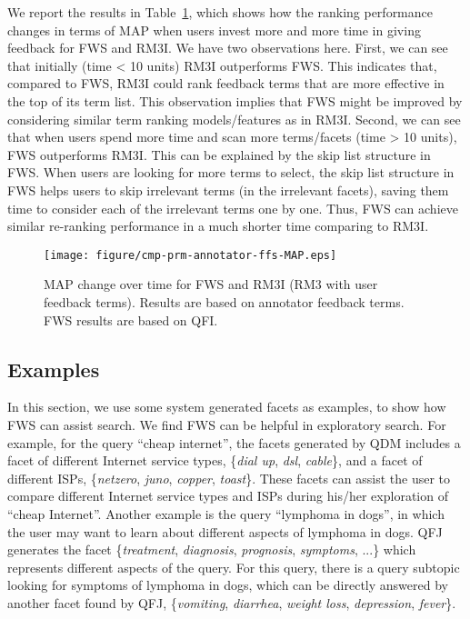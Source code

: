 We report the results in Table~\ref{fig:ex-rm3i}, which shows how the ranking performance changes in terms of MAP when users invest more and more time in giving feedback for FWS and RM3I. We have two observations here. First, we can see that initially (time < 10 units) RM3I outperforms FWS. This indicates that, compared to FWS, RM3I could rank feedback terms that are more effective in the top of its term list. This observation implies that FWS might be improved by considering similar term ranking models/features as in RM3I. Second, we can see that when users spend more time and scan more terms/facets (time > 10 units), FWS outperforms RM3I. This can be explained by the skip list structure in FWS. When users are looking for more terms to select, the skip list structure in FWS helps users to skip irrelevant terms (in the irrelevant facets), saving them time to consider each of the irrelevant terms one by one. Thus, FWS can achieve similar re-ranking performance in a much shorter time comparing to RM3I.
 
\begin{figure}[!ht]
\centering
\texttt{[image: figure/cmp-prm-annotator-ffs-MAP.eps]}
\caption{MAP change over time for FWS and RM3I (RM3 with user feedback terms). Results are based on annotator feedback terms. FWS results are based on QFI.}
\label{fig:ex-rm3i}
\end{figure}

\subsection{Examples}
In this section, we use some system generated facets as examples, to show how FWS can assist search. We find FWS can be helpful in exploratory search. 
For example, for the query ``cheap internet'', the facets generated by QDM includes a facet of different Internet service types, \{\textit{dial up}, \textit{dsl}, \textit{cable}\}, and a facet of different ISPs, \{\textit{netzero}, \textit{juno}, \textit{copper}, \textit{toast}\}. These facets can assist the user to compare different Internet service types and ISPs during his/her exploration of ``cheap Internet''. Another example is the query ``lymphoma in dogs'', in which the user may want to learn about different aspects of lymphoma in dogs. QFJ generates the facet \{\textit{treatment}, \textit{diagnosis}, \textit{prognosis}, \textit{symptoms}, ...\} which represents different aspects of the query. For this query, there is a query subtopic looking for symptoms of lymphoma in dogs, which can be directly answered by another facet found by QFJ, \{\textit{vomiting}, \textit{diarrhea}, \textit{weight loss}, \textit{depression}, \textit{fever}\}. 


